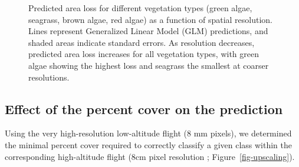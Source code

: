 \documentclass[
  letterpaper,
  11pt,
  english,
  singlespacing,
  headsepline]{MastersDoctoralThesis}
\begin{document}
\begin{spacing}{1.5}
\begin{figure}
{}

\caption{\label{fig-pixelsize}Predicted area loss for different
vegetation types (green algae, seagrass, brown algae, red algae) as a
function of spatial resolution. Lines represent Generalized Linear Model
(GLM) predictions, and shaded areas indicate standard errors. As
resolution decreases, predicted area loss increases for all vegetation
types, with green algae showing the highest loss and seagrass the
smallest at coarser resolutions.}

\end{figure}%

\subsection{Effect of the percent cover on the
prediction}\label{effect-of-the-percent-cover-on-the-prediction}

Using the very high-resolution low-altitude flight (8 mm pixels), we
determined the minimal percent cover required to correctly classify a
given class within the corresponding high-altitude flight (8cm pixel
resolution ; Figure~\ref{fig-upscaling}).

\begin{figure}

\end{figure}
\end{spacing}
\end{document}
